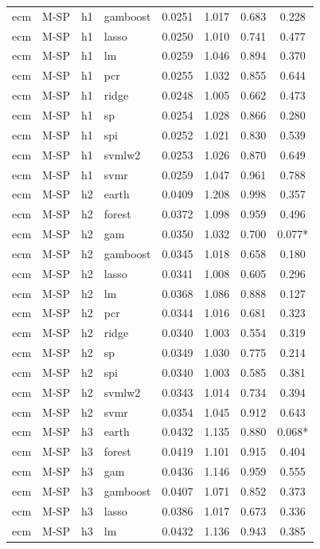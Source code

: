 \begin{ThreePartTable}
\begin{longtable}[t]{llclcccc}
ecm & M-SP & h1 & gamboost & 0.0251 & 1.017 & 0.683 & 0.228\\
ecm & M-SP & h1 & lasso & 0.0250 & 1.010 & 0.741 & 0.477\\
ecm & M-SP & h1 & lm & 0.0259 & 1.046 & 0.894 & 0.370\\
ecm & M-SP & h1 & pcr & 0.0255 & 1.032 & 0.855 & 0.644\\
ecm & M-SP & h1 & ridge & 0.0248 & 1.005 & 0.662 & 0.473\\
ecm & M-SP & h1 & sp & 0.0254 & 1.028 & 0.866 & 0.280\\
ecm & M-SP & h1 & spi & 0.0252 & 1.021 & 0.830 & 0.539\\
ecm & M-SP & h1 & svmlw2 & 0.0253 & 1.026 & 0.870 & 0.649\\
ecm & M-SP & h1 & svmr & 0.0259 & 1.047 & 0.961 & 0.788\\
\addlinespace
ecm & M-SP & h2 & earth & 0.0409 & 1.208 & 0.998 & 0.357\\
ecm & M-SP & h2 & forest & 0.0372 & 1.098 & 0.959 & 0.496\\
ecm & M-SP & h2 & gam & 0.0350 & 1.032 & 0.700 & 0.077*\\
ecm & M-SP & h2 & gamboost & 0.0345 & 1.018 & 0.658 & 0.180\\
ecm & M-SP & h2 & lasso & 0.0341 & 1.008 & 0.605 & 0.296\\
ecm & M-SP & h2 & lm & 0.0368 & 1.086 & 0.888 & 0.127\\
ecm & M-SP & h2 & pcr & 0.0344 & 1.016 & 0.681 & 0.323\\
ecm & M-SP & h2 & ridge & 0.0340 & 1.003 & 0.554 & 0.319\\
ecm & M-SP & h2 & sp & 0.0349 & 1.030 & 0.775 & 0.214\\
ecm & M-SP & h2 & spi & 0.0340 & 1.003 & 0.585 & 0.381\\
ecm & M-SP & h2 & svmlw2 & 0.0343 & 1.014 & 0.734 & 0.394\\
ecm & M-SP & h2 & svmr & 0.0354 & 1.045 & 0.912 & 0.643\\
\addlinespace
ecm & M-SP & h3 & earth & 0.0432 & 1.135 & 0.880 & 0.068*\\
ecm & M-SP & h3 & forest & 0.0419 & 1.101 & 0.915 & 0.404\\
ecm & M-SP & h3 & gam & 0.0436 & 1.146 & 0.959 & 0.555\\
ecm & M-SP & h3 & gamboost & 0.0407 & 1.071 & 0.852 & 0.373\\
ecm & M-SP & h3 & lasso & 0.0386 & 1.017 & 0.673 & 0.336\\
ecm & M-SP & h3 & lm & 0.0432 & 1.136 & 0.943 & 0.385\\

\end{longtable}
\end{ThreePartTable}
